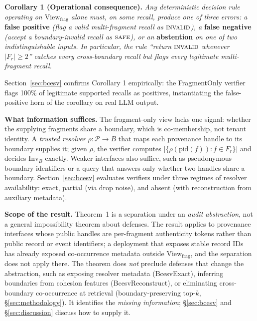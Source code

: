 \documentclass[conference,compsoc]{IEEEtran}
\begin{document}
\smallskip
\noindent\textbf{Corollary 1 (Operational consequence).}
\emph{Any deterministic decision rule operating on $\mathrm{View}_{\mathrm{frag}}$ alone must, on some recall, produce one of three errors: a} \textbf{false positive} \emph{(flag a valid multi-fragment recall as $\textsc{invalid}$), a} \textbf{false negative} \emph{(accept a boundary-invalid recall as $\textsc{safe}$), or an} \textbf{abstention} \emph{on one of two indistinguishable inputs. In particular, the rule ``return $\textsc{invalid}$ whenever $|F_{r}| \geq 2$'' catches every cross-boundary recall but flags every legitimate multi-fragment recall.}

\smallskip
Section~\ref{sec:bcesv} confirms Corollary 1 empirically: the FragmentOnly verifier flags 100\% of legitimate supported recalls as positives, instantiating the false-positive horn of the corollary on real LLM output.

\smallskip
\noindent\textbf{What information suffices.} The fragment-only view lacks one signal: whether the supplying fragments share a boundary, which is co-membership, not tenant identity. A \emph{trusted resolver} $\rho: \mathcal{P} \to B$ that maps each provenance handle to its boundary supplies it; given $\rho$, the verifier computes $|\{\rho(\mathrm{pid}(f)) : f \in F_{r}\}|$ and decides $\mathrm{Inv}_{B}$ exactly. Weaker interfaces also suffice, such as pseudonymous boundary identifiers or a query that answers only whether two handles share a boundary. Section~\ref{sec:bcesv} evaluates verifiers under three regimes of resolver availability: exact, partial (via drop noise), and absent (with reconstruction from auxiliary metadata).

\smallskip
\noindent\textbf{Scope of the result.} Theorem~1 is a separation under an \emph{audit abstraction}, not a general impossibility theorem about defenses. The result applies to provenance interfaces whose public handles are per-fragment authenticity tokens rather than public record or event identifiers; a deployment that exposes stable record IDs has already exposed co-occurrence metadata outside $\mathrm{View}_{\mathrm{frag}}$, and the separation does not apply there. The theorem does \emph{not} preclude defenses that change the abstraction, such as exposing resolver metadata (BcesvExact), inferring boundaries from cohesion features (BcesvReconstruct), or eliminating cross-boundary co-occurrence at retrieval (boundary-preserving top-$k$, \S\ref{sec:methodology}). It identifies the \emph{missing information}; \S\ref{sec:bcesv} and \S\ref{sec:discussion} discuss how to supply it.
\end{document}
